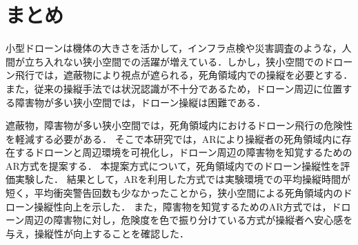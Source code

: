 \documentclass[submit, sigrecommended]{ipsj}
\begin{document}
\section{まとめ}
\label{sec:Conclusion}
小型ドローンは機体の大きさを活かして，インフラ点検や災害調査のような，人間が立ち入れない狭小空間での活躍が増えている．しかし，狭小空間でのドローン飛行では，遮蔽物により視点が遮られる，死角領域内での操縦を必要とする．また，従来の操縦手法では状況認識が不十分であるため，ドローン周辺に位置する障害物が多い狭小空間では，ドローン操縦は困難である．\par
遮蔽物，障害物が多い狭小空間では，死角領域内におけるドローン飛行の危険性を軽減する必要がある．
そこで本研究では，ARにより操縦者の死角領域内に存在するドローンと周辺環境を可視化し，ドローン周辺の障害物を知覚するためのAR方式を提案する．
本提案方式について，死角領域内でのドローン操縦性を評価実験した．
結果として，ARを利用した方式では実験環境での平均操縦時間が短く，平均衝突警告回数も少なかったことから，狭小空間による死角領域内のドローン操縦性向上を示した．
また，障害物を知覚するためのAR方式では，ドローン周辺の障害物に対し，危険度を色で振り分けている方式が操縦者へ安心感を与え，操縦性が向上することを確認した．



\begin{biography}
%
%
\end{biography}
\end{document}
